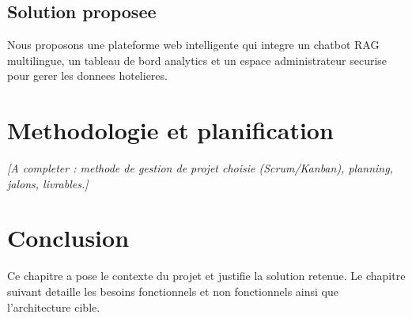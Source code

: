 \subsection{Solution proposee}
Nous proposons une plateforme web intelligente qui integre un chatbot RAG multilingue, un tableau de bord analytics et un espace administrateur securise pour gerer les donnees hotelieres.

\section{Methodologie et planification}
\textit{[A completer : methode de gestion de projet choisie (Scrum/Kanban), planning, jalons, livrables.]}

\section{Conclusion}
Ce chapitre a pose le contexte du projet et justifie la solution retenue. Le chapitre suivant detaille les besoins fonctionnels et non fonctionnels ainsi que l'architecture cible.
